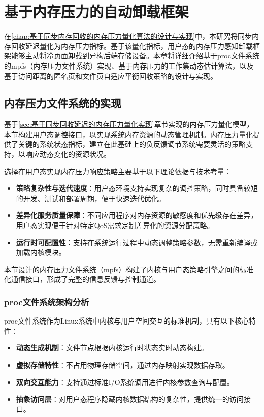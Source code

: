 \chapter{基于内存压力的自动卸载框架}
\label{chap:基于内存压力的自动卸载框架}

在\ref{chap:基于同步内存回收的内存压力量化算法的设计与实现}中，本研究将同步内存回收延迟量化为内存压力指标。基于该量化指标，用户态的内存压力感知卸载框架能够主动将冷页面卸载到异构后端存储设备。本章将详细介绍基于proc文件系统的mpfs（内存压力文件系统）实现、基于内存压力的工作集动态估计算法，以及基于访问距离的匿名页和文件页自适应平衡回收策略的设计与实现。

\section{内存压力文件系统的实现}
\label{sec:mpfs_implementation}

基于\ref{sec:基于同步回收延迟的内存压力量化实现}章节实现的内存压力量化模型，本节构建用户态调控接口，以实现系统内存资源的动态管理机制。内存压力量化提供了关键的系统状态指标，建立在此基础上的负反馈调节系统需要灵活的策略支持，以响应动态变化的资源状况。

选择在用户态实现内存压力响应策略主要基于以下理论依据与技术考量：

\begin{itemize}
    \item \textbf{策略复杂性与迭代速度}：用户态环境支持实现复杂的调控策略，同时具备较短的开发、测试和部署周期，便于快速迭代优化。
    \item \textbf{差异化服务质量保障}：不同应用程序对内存资源的敏感度和优先级存在差异，用户态实现便于针对特定QoS需求定制差异化的资源分配策略。
    \item \textbf{运行时可配置性}：支持在系统运行过程中动态调整策略参数，无需重新编译或加载内核模块。
\end{itemize}

本节设计的内存压力文件系统（mpfs）构建了内核与用户态策略引擎之间的标准化通信接口，形成了完整的信息反馈与控制通道。

\subsection{proc文件系统架构分析}

proc文件系统作为Linux系统中内核与用户空间交互的标准机制，具有以下核心特性：

\begin{itemize}
    \item \textbf{动态生成机制}：文件节点根据内核运行时状态实时动态构建。
    \item \textbf{虚拟存储特性}：不占用物理存储空间，通过内存映射实现数据存取。
    \item \textbf{双向交互能力}：支持通过标准I/O系统调用进行内核参数查询与配置。
    \item \textbf{抽象访问层}：对用户态程序隐藏内核数据结构的复杂性，提供统一的访问接口。
\end{itemize}

